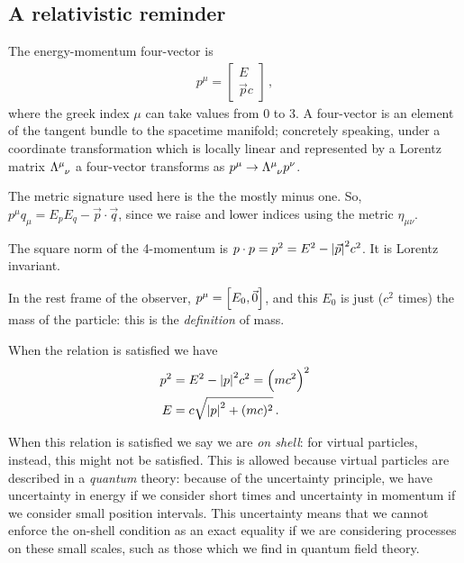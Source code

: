\documentclass[main.tex]{subfiles}
\begin{document}
\subsection{A relativistic reminder}

The energy-momentum four-vector is 
%
\begin{subequations}
\begin{align}
p^{\mu } = \left[\begin{array}{c}
E \\ \vec{p} c
\end{array}\right]
\,,
\end{align}
\end{subequations}
%
where the greek index \(\mu \) can take values from 0 to 3. A four-vector is an element of the tangent bundle to the spacetime manifold; concretely speaking, under a coordinate transformation which is locally linear and represented by a Lorentz matrix \(\tensor{\Lambda }{^{\mu }_{\nu }}\) a four-vector transforms as \(p^{\mu } \to \tensor{\Lambda }{^{\mu }_{\nu }} p^{\nu } \). 

The metric signature used here is the the mostly minus one. So, \(p^{\mu } q_{\mu } = E_{p} E_{q} - \vec{p} \cdot \vec{q}\), since we raise and lower indices using the metric \(\eta_{\mu \nu }\). 

The square norm of the 4-momentum is \(p \cdot p  = p^2 = E^2 - \abs{\vec{p}}^2 c^2\). It is Lorentz invariant.

In the rest frame of the observer, \(p^{\mu } = \qty[E_{0}, \vec{0}]\), and this \(E_0\) is just (\(c^2\) times)
 the mass of the particle: this is the \emph{definition} of mass. 

When the relation is satisfied we have 
%
\begin{subequations}
\begin{align}
p^2 &= E^2 - \abs{p}^2 c^2= \qty(mc^2)^2  \\
E &= c \sqrt{\abs{p}^2 + (mc)^2}
\,.
\end{align}
\end{subequations}


When this relation is satisfied we say we are \emph{on shell}: for virtual particles, instead, this might not be satisfied. This is allowed because virtual particles are described in a \emph{quantum} theory: because of the uncertainty principle, we have uncertainty in energy if we consider short times and uncertainty in momentum if we consider small position intervals.
This uncertainty means that we cannot enforce the on-shell condition as an exact equality if we are considering processes on these small scales, such as those which we find in quantum field theory. 
\end{document}
